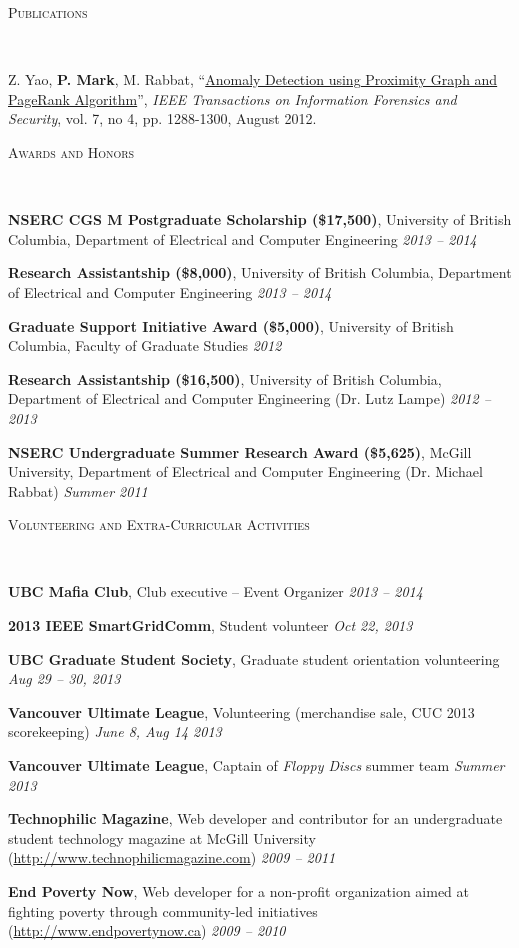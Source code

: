 \documentclass[10pt]{article}
\newenvironment{changemargin}[2]{%
  \begin{list}{}{%
    \setlength{\topsep}{0pt}%
    \setlength{\leftmargin}{#1}%
    \setlength{\rightmargin}{#2}%
    \setlength{\listparindent}{\parindent}%
    \setlength{\itemindent}{\parindent}%
    \setlength{\parsep}{\parskip}%
  }%
  \item[]}{\end{list}
}
\newcommand{\lineover}{
  \begin{changemargin}{-0.05in}{-0.05in}
    \vspace*{-8pt}
    \hrulefill \\
    \vspace*{-2pt}
  \end{changemargin}
}
\renewcommand{\section}[1]{
  \begin{changemargin}{-0.5in}{-0.5in}
    \normalsize \scshape{#1}\\
    \lineover
  \end{changemargin}
}
\newenvironment{body} {
  \vspace{2pt}
  \begin{changemargin}{-0.25in}{-0.5in}
    }{
  \end{changemargin}
}
\newcommand{\itemdescription}[3]{
  \textbf{#1}, {#2} \hfill \emph{#3}\\
  \medskip
}
\begin{document}
\section{Publications}
\begin{body}
Z. Yao, \textbf{P. Mark}, M. Rabbat, 
``\href{http://ieeexplore.ieee.org/xpl/articleDetails.jsp?arnumber=6175122}{Anomaly
Detection using Proximity Graph and PageRank Algorithm}'', \emph{IEEE 
Transactions on Information Forensics and Security}, vol. 7, no 4, pp. 
1288-1300, August 2012.
\end{body}
\bigskip

\section{Awards and Honors}
\begin{body}
\itemdescription{NSERC CGS M Postgraduate Scholarship (\$17,500)}{University of 
British Columbia, Department of Electrical and Computer Engineering}{2013 -- 
2014}
\itemdescription{Research Assistantship (\$8,000)}{University of British
Columbia, Department of Electrical and Computer Engineering}{2013 -- 2014}
\itemdescription{Graduate Support Initiative Award (\$5,000)}{University of
British Columbia, Faculty of Graduate Studies}{2012}
\itemdescription{Research Assistantship (\$16,500)}{University of British 
Columbia, Department of Electrical and Computer Engineering (Dr. Lutz 
Lampe)}{2012 -- 2013}
\itemdescription{NSERC Undergraduate Summer Research Award (\$5,625)}{McGill 
University, Department of Electrical and Computer Engineering (Dr. Michael 
Rabbat)}{Summer 2011}
\end{body}
\medskip

\section{Volunteering and Extra-Curricular Activities}
\begin{body}
\itemdescription{UBC Mafia Club}{Club executive -- Event Organizer}{2013 -- 
2014}
\itemdescription{2013 IEEE SmartGridComm}{Student volunteer}{Oct 22, 2013}
\itemdescription{UBC Graduate Student Society}{Graduate student orientation
volunteering}{Aug 29 -- 30, 2013}
\itemdescription{Vancouver Ultimate League}{Volunteering (merchandise sale, CUC 
2013 scorekeeping)}{June 8, Aug 14 2013}
\itemdescription{Vancouver Ultimate League}{Captain of \emph{Floppy Discs} 
summer team}{Summer 2013}
\itemdescription{Technophilic Magazine}{Web developer and contributor for an
undergraduate student technology magazine at McGill University
(\url{http://www.technophilicmagazine.com})}{2009 -- 2011}
\itemdescription{End Poverty Now}{Web developer for a non-profit organization 
aimed at fighting poverty through community-led initiatives
(\url{http://www.endpovertynow.ca})}{2009 -- 2010}
\end{body}
\medskip
\end{document}
